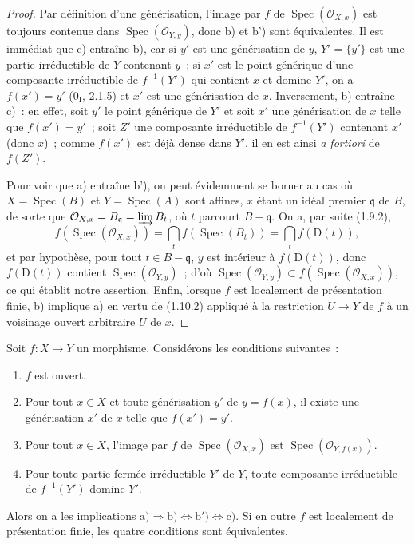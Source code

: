 \begin{proof}
Par définition d'une générisation, l'image par $f$ de
$\operatorname{Spec}(\mathcal O_{X,x})$ est toujours contenue dans
$\operatorname{Spec}(\mathcal O_{Y,y})$, donc b) et b') sont équivalentes. Il
est immédiat
que c) entraîne b), car si $y'$ est une générisation de $y$,
$Y'=\overline{\{y'\}}$ est une partie irréductible de $Y$ contenant $y$~; si
$x'$ est le point générique d'une composante irréductible de $f^{-1}(Y')$ qui
contient $x$ et domine $Y'$, on a $f(x')=y'$ ($0_{\mathrm I}$, 2.1.5) et $x'$
est une générisation de $x$. Inversement, b) entraîne c)~: en effet, soit
$y'$ le point générique de $Y'$ et soit $x'$ une générisation de $x$ telle
que $f(x')=y'$~; soit $Z'$ une composante irréductible de $f^{-1}(Y')$
contenant $x'$ (donc $x$)~; comme $f(x')$ est déjà dense dans $Y'$, il en est
ainsi \emph{a fortiori} de $f(Z')$.

Pour voir que a) entraîne b'), on peut évidemment se borner au cas où
$X=\operatorname{Spec}(B)$ et $Y=\operatorname{Spec}(A)$ sont affines, $x$
étant un idéal premier
$\mathfrak q$ de $B$, de sorte que
$\mathcal O_{X,x}=B_{\mathfrak q}=\varinjlim B_t$,
où $t$ parcourt $B-\mathfrak q$. On a, par suite (1.9.2),
\[
  f(\operatorname{Spec}(\mathcal O_{X,x}))
  =\bigcap_t f(\operatorname{Spec}(B_t))=\bigcap_t f(\mathrm D(t)),
\]
et par hypothèse, pour tout $t\in B-\mathfrak q$, $y$ est intérieur à
$f(\mathrm D(t))$, donc $f(\mathrm D(t))$ contient
$\operatorname{Spec}(\mathcal O_{Y,y})$~; d'où
$\operatorname{Spec}(\mathcal O_{Y,y})
\subset f(\operatorname{Spec}(\mathcal O_{X,x}))$, ce qui établit
notre assertion. Enfin, lorsque $f$ est localement de présentation finie, b)
implique a) en vertu de (1.10.2) appliqué à la restriction $U\to Y$ de $f$ à
un voisinage ouvert arbitraire $U$ de $x$.
\end{proof}

\begin{corollary}[1.10.4]
\label{IV.1.10.4-fr}
Soit $f:X\to Y$ un morphisme. Considérons les conditions suivantes~:
\begin{enumerate}
  \item[a)] $f$ est ouvert.
  \item[b)] Pour tout $x\in X$ et toute générisation $y'$ de $y=f(x)$, il
  existe une générisation $x'$ de $x$ telle que $f(x')=y'$.
  \item[b')] Pour tout $x\in X$, l'image par $f$ de
  $\operatorname{Spec}(\mathcal O_{X,x})$ est
  $\operatorname{Spec}(\mathcal O_{Y,f(x)})$.
  \item[c)] Pour toute partie fermée irréductible $Y'$ de $Y$, toute
  composante irréductible de $f^{-1}(Y')$ domine $Y'$.
\end{enumerate}
Alors on a les implications
$\mathrm{a)}\Rightarrow\mathrm{b)}\Leftrightarrow\mathrm{b')}
\Leftrightarrow\mathrm{c)}$. Si en outre $f$ est localement de présentation
finie, les quatre conditions sont équivalentes.
\end{corollary}

